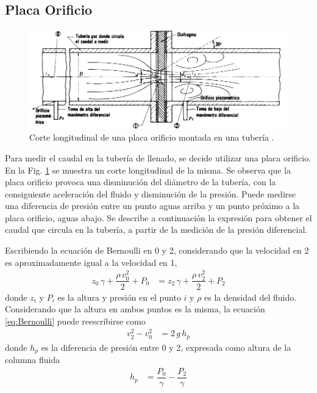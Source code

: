 \subsection{Placa Orificio}
\label{subsec:PlacaOrificio}


\begin{figure}[t]
 \centering
\includegraphics[width=\textwidth]{Cap2-DisenoEnsamblado/images/placaOrif.png}
\caption{Corte longitudinal de una placa orificio montada en una tubería
\cite{bib:Mataix}.}
 \label{fig:placaOrificio}
\end{figure}

Para medir el caudal en la tubería de llenado, se decide
utilizar una placa orificio.
En la Fig. \ref{fig:placaOrificio} se muestra un
corte longitudinal de la misma.
Se observa que la placa orificio provoca una disminución del diámetro
de la tubería, con la consiguiente aceleración del fluido y disminución de la
presión.
Puede medirse una diferencia de presión entre un punto aguas arriba y un punto
próximo a la placa orificio, aguas abajo.
Se describe a continuación la expresión para obtener el caudal que circula en
la tubería, a partir de la medición de la presión diferencial.

Escribiendo la ecuación de Bernoulli en 0 y 2, considerando que la velocidad en
2 es aproximadamente igual a la velocidad en 1,
\begin{align}
 z_0 \, \gamma + \dfrac{\rho \,v_0^2}{2} + P_0 &= z_2 \, \gamma + \dfrac{\rho
\,v_2^2}{2} + P_2
\label{eq:Bernoulli}
\end{align}
donde $z_i$ y $P_i$ es la altura y presión en el punto $i$ y $\rho$ es 
la densidad del fluido.
Considerando que la altura en ambos puntos es la misma, la ecuación
\eqref{eq:Bernoulli} puede reescribirse como
\begin{align}
 v_2^2 - v_0^2 &= 2\,g\,h_p
 \label{eq:Bernoulli2}
\end{align}
donde $h_p$ es la diferencia de presión entre 0 y 2, expresada como
altura de la columna fluida
\begin{align}
 h_p &= \dfrac{P_0}{\gamma}-\dfrac{P_2}{\gamma}
\end{align}

